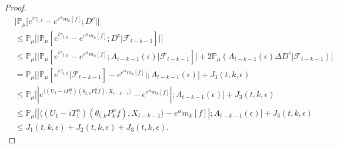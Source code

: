 \documentclass[12pt,a4paper]{amsart}
\theoremstyle{plain}
\theoremstyle{definition}
\numberwithin{equation}{section}
\begin{document}
\begin{proof}
\begin{equation}
\begin{split}
\label{eq: inequality that will used later}
    &\big|\mathbb{P}_{\mu}\big[e^{i\gamma_{t,k}}-e^{e^{\alpha}m_k[f]}; D^c\big]\big|
    \\& \leq \mathbb{P}_{\mu}\Big[\big| \mathbb{P}_{\mu}[e^{i\gamma_{t,k}}-e^{e^{\alpha}m_k[f]}; D^c | \mathscr F_{t-k-1}]\big|\Big]
    \\& \leq \mathbb{P}_{\mu}\Big[\big| \mathbb{P}_{\mu}[e^{i\gamma_{t,k}}-e^{e^{\alpha}m_k[f]}; A_{t-k-1}(\epsilon)| \mathscr F_{t-k-1}]\big| + 2\mathbb P_\mu(A_{t-k-1}(\epsilon) \Delta D^c| \mathscr F_{t-k-1})\Big]
    \\& = \mathbb{P}_{\mu}\Big[ \big|\mathbb{P}_{\mu}[e^{i\gamma_{t,k}}| \mathscr F_{t-k-1}]-e^{e^{\alpha}m_k[f]}\big|;A_{t-k-1}(\epsilon)\Big] + J_3(t,k,\epsilon)
    \\& \leq \mathbb{P}_{\mu}\big[|e^{\langle (U_1 - iP^\alpha_1 ) (\theta_{t,k}P^\alpha_k f),X_{t-k-1}\rangle}-e^{e^{\alpha}m_k[f]}|;A_{t-k-1}(\epsilon)\big]+  J_3(t,k,\epsilon)
    \\& \leq \mathbb{P}_{\mu}\big[|\langle (U_1 - i T_1^\alpha)(\theta_{t,k}P^\alpha_k f),X_{t-k-1}\rangle-e^{\alpha}m_k[f]|;A_{t-k-1}(\epsilon)\big]+  J_3(t,k,\epsilon)
    \\&\leq J_1(t,k,\epsilon) + J_2(t,k,\epsilon)+J_3(t,k,\epsilon).
\end{split}\end{equation}


\end{proof}
\end{document}
